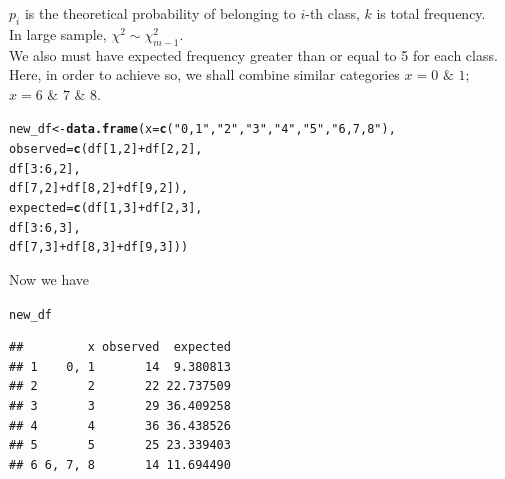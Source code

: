 \documentclass[11pt, a4paper]{article}\usepackage[]{graphicx}\usepackage[]{xcolor}
\makeatletter
\newcommand{\hlnum}[1]{\textcolor[rgb]{0.686,0.059,0.569}{#1}}%
\newcommand{\hlsng}[1]{\textcolor[rgb]{0.192,0.494,0.8}{#1}}%
\newcommand{\hlopt}[1]{\textcolor[rgb]{0,0,0}{#1}}%
\newcommand{\hldef}[1]{\textcolor[rgb]{0.345,0.345,0.345}{#1}}%
\newcommand{\hlkwb}[1]{\textcolor[rgb]{0.69,0.353,0.396}{#1}}%
\newcommand{\hlkwc}[1]{\textcolor[rgb]{0.333,0.667,0.333}{#1}}%
\newcommand{\hlkwd}[1]{\textcolor[rgb]{0.737,0.353,0.396}{\textbf{#1}}}%
\newenvironment{kframe}{%
 \def\at@end@of@kframe{}%
 \ifinner\ifhmode%
  \def\at@end@of@kframe{\end{minipage}}%
  \begin{minipage}{\columnwidth}%
 \fi\fi%
 \def\FrameCommand##1{\hskip\@totalleftmargin \hskip-\fboxsep
 \colorbox{shadecolor}{##1}\hskip-\fboxsep
     \hskip-\linewidth \hskip-\@totalleftmargin \hskip\columnwidth}%
 \MakeFramed {\advance\hsize-\width
   \@totalleftmargin\z@ \linewidth\hsize
   \@setminipage}}%
 {\par\unskip\endMakeFramed%
 \at@end@of@kframe}
\newenvironment{knitrout}{}{} %
\makeatother
\begin{document}
$p_i$ is the theoretical probability of belonging to $i$-th class, $k$ is total frequency. \\

In large sample, $\chi^2 \sim \chi^2_{m-1}$. \\

We also must have expected frequency greater than or equal to 5 for each class. \\

Here, in order to achieve so, we shall combine similar categories $x = 0 \,\, \& \,\, 1$; $x = 6 \,\, \& \,\, 7 \,\, \& \,\, 8$. \\

\begin{knitrout}
\color{fgcolor}\begin{kframe}
\begin{alltt}
\hldef{new_df} \hlkwb{<-} \hlkwd{data.frame}\hldef{(}\hlkwc{x} \hldef{=} \hlkwd{c}\hldef{(}\hlsng{"0, 1"}\hldef{,} \hlsng{"2"}\hldef{,} \hlsng{"3"}\hldef{,} \hlsng{"4"}\hldef{,} \hlsng{"5"}\hldef{,} \hlsng{"6, 7, 8"}\hldef{),}
                     \hlkwc{observed} \hldef{=} \hlkwd{c}\hldef{(df[}\hlnum{1}\hldef{,} \hlnum{2}\hldef{]} \hlopt{+} \hldef{df[}\hlnum{2}\hldef{,} \hlnum{2}\hldef{],}
                                  \hldef{df[}\hlnum{3}\hlopt{:}\hlnum{6}\hldef{,} \hlnum{2}\hldef{],}
                                  \hldef{df[}\hlnum{7}\hldef{,} \hlnum{2}\hldef{]} \hlopt{+} \hldef{df[}\hlnum{8}\hldef{,} \hlnum{2}\hldef{]} \hlopt{+} \hldef{df[}\hlnum{9}\hldef{,} \hlnum{2}\hldef{]),}
                     \hlkwc{expected} \hldef{=} \hlkwd{c}\hldef{(df[}\hlnum{1}\hldef{,} \hlnum{3}\hldef{]} \hlopt{+} \hldef{df[}\hlnum{2}\hldef{,} \hlnum{3}\hldef{],}
                                  \hldef{df[}\hlnum{3}\hlopt{:}\hlnum{6}\hldef{,} \hlnum{3}\hldef{],}
                                  \hldef{df[}\hlnum{7}\hldef{,} \hlnum{3}\hldef{]} \hlopt{+} \hldef{df[}\hlnum{8}\hldef{,} \hlnum{3}\hldef{]} \hlopt{+} \hldef{df[}\hlnum{9}\hldef{,} \hlnum{3}\hldef{]))}
\end{alltt}
\end{kframe}
\end{knitrout}

Now we have

\begin{knitrout}
\color{fgcolor}\begin{kframe}
\begin{alltt}
\hldef{new_df}
\end{alltt}
\begin{verbatim}
##         x observed  expected
## 1    0, 1       14  9.380813
## 2       2       22 22.737509
## 3       3       29 36.409258
## 4       4       36 36.438526
## 5       5       25 23.339403
## 6 6, 7, 8       14 11.694490
\end{verbatim}
\end{kframe}
\end{knitrout}
\end{document}

